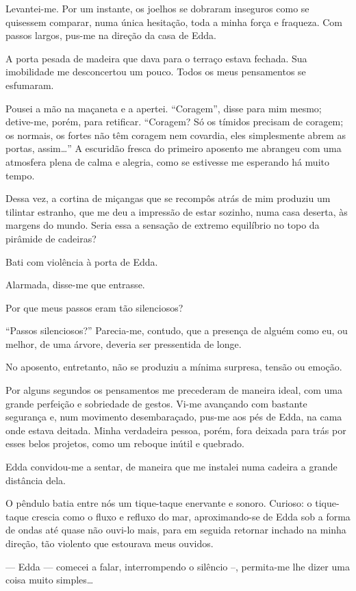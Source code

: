 Levantei-me. Por um instante, os joelhos se dobraram inseguros como se quisessem comparar, numa única hesitação, toda a minha força e fraqueza. Com passos largos, pus-me na direção da casa de Edda.

A porta pesada de madeira que dava para o terraço estava fechada. Sua imobilidade me desconcertou um pouco. Todos os meus pensamentos se esfumaram.

Pousei a mão na maçaneta e a apertei. ``Coragem'', disse para mim mesmo; detive-me, porém, para retificar. ``Coragem? Só os tímidos precisam de coragem; os normais, os fortes não têm coragem nem covardia, eles simplesmente abrem as portas, assim\ldots{}''
A escuridão fresca do primeiro aposento me abrangeu com uma atmosfera plena de calma e alegria, como se estivesse me esperando há muito tempo.

Dessa vez, a cortina de miçangas que se recompôs atrás de mim produziu um tilintar estranho, que me deu a impressão de estar sozinho, numa casa deserta, às margens do mundo. Seria essa a sensação de extremo equilíbrio no topo da pirâmide de cadeiras?

Bati com violência à porta de Edda.

Alarmada, disse-me que entrasse.

Por que meus passos eram tão silenciosos?

``Passos silenciosos?'' Parecia-me, contudo, que a presença de alguém como eu, ou melhor, de uma árvore, deveria ser pressentida de longe.

No aposento, entretanto, não se produziu a mínima surpresa, tensão ou emoção.

Por alguns segundos os pensamentos me precederam de maneira ideal, com uma grande perfeição e sobriedade de gestos. Vi-me avançando com bastante segurança e, num movimento desembaraçado, pus-me aos pés de Edda, na cama onde estava deitada. Minha verdadeira pessoa, porém, fora deixada para trás por esses belos projetos, como um reboque inútil e quebrado.

Edda convidou-me a sentar, de maneira que me instalei numa cadeira a grande distância dela.

O pêndulo batia entre nós um tique-taque enervante e sonoro. Curioso: o tique-taque crescia como o fluxo e refluxo do mar, aproximando-se de Edda sob a forma de ondas até quase não ouvi-lo mais, para em seguida retornar inchado na minha direção, tão violento que estourava meus ouvidos.

--- Edda --- comecei a falar, interrompendo o silêncio --, permita-me lhe dizer uma coisa muito simples\ldots{}

